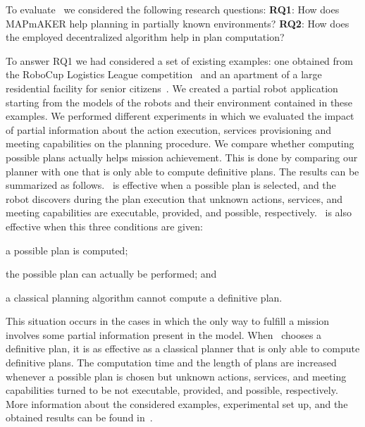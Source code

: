 To evaluate  \toolName\ we considered the following research questions: \textbf{RQ1}: How does MAPmAKER help planning in partially known environments? \textbf{RQ2}: How does the employed decentralized algorithm help in plan computation?

To answer RQ1 we  had considered a set of existing examples:
one obtained from the RoboCup Logistics League competition~\cite{karrasrobocup} and an apartment of a large residential facility for senior citizens~\cite{map}.
We created a partial robot application starting from the models of the robots and their environment contained in these examples.
We performed different experiments in which we evaluated the impact of partial information about the action execution, services provisioning and meeting capabilities on the planning procedure.
We compare whether computing possible plans actually helps mission achievement.
This is done by comparing our planner with one that is only able to compute definitive plans.
The results can be summarized as follows.
\toolName\ is effective when  a possible plan is selected, and the robot discovers during the plan execution 
that unknown actions, services, and meeting capabilities are executable, provided, and possible, respectively.
\toolName\ is also effective when this three conditions are given:
\begin{enumerate*}
\item a possible plan is computed;
\item the possible plan can actually be performed; and 
\item a classical planning algorithm cannot compute a definitive plan.
\end{enumerate*}
This situation occurs in the cases in which the only way to fulfill a mission involves some partial information present in the model.
When \toolName\ chooses a definitive plan, it is as effective as a classical planner that is only able to compute definitive plans.
The computation time and the length of plans are increased whenever  a possible plan is chosen but unknown actions, services, and meeting capabilities turned to be not executable, provided, and possible, respectively.
More information about the considered examples, experimental set up, and the obtained results can be found in~\cite{mapmaker17}.

